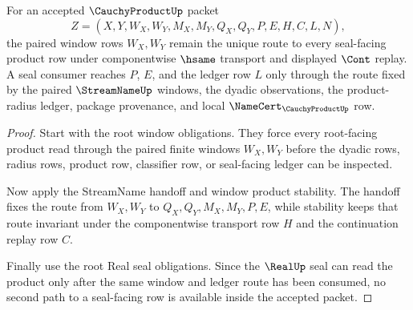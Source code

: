 \begin{theorem}
\label{thm:cauchy-product-root-window-seal-stability}
For an accepted $\CauchyProductUp$ packet
$$
Z=(X,Y,W_X,W_Y,M_X,M_Y,Q_X,Q_Y,P,E,H,C,L,N),
$$
the paired window rows $W_X,W_Y$ remain the unique route to every seal-facing product row under componentwise $\hsame$ transport and displayed $\Cont$ replay. A seal consumer reaches $P$, $E$, and the ledger row $L$ only through the route fixed by the paired $\StreamNameUp$ windows, the dyadic observations, the product-radius ledger, package provenance, and local $\NameCert_{\CauchyProductUp}$ row.
\end{theorem}
\begin{proof}
Start with the root window obligations. They force every root-facing product read through the paired finite windows $W_X,W_Y$ before the dyadic rows, radius rows, product row, classifier row, or seal-facing ledger can be inspected.

Now apply the StreamName handoff and window product stability. The handoff fixes the route from $W_X,W_Y$ to $Q_X,Q_Y,M_X,M_Y,P,E$, while stability keeps that route invariant under the componentwise transport row $H$ and the continuation replay row $C$.

Finally use the root Real seal obligations. Since the $\RealUp$ seal can read the product only after the same window and ledger route has been consumed, no second path to a seal-facing row is available inside the accepted packet.
\end{proof}

